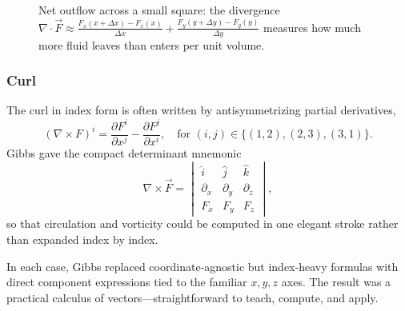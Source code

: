 \begin{figure}[H]
    \centering
    \caption{Net outflow across a small square: the divergence 
    \(\nabla\!\cdot\vec F\approx\frac{F_x(x+\Delta x)-F_x(x)}{\Delta x}+\frac{F_y(y+\Delta y)-F_y(y)}{\Delta y}\)
    measures how much more fluid leaves than enters per unit volume.}
\end{figure}







\subsubsection{Curl}
The curl in index form is often written by antisymmetrizing partial derivatives,
\[
(\nabla\times F)^i = \frac{\partial F^i}{\partial x^j} - \frac{\partial F^j}{\partial x^i},
\quad\text{for }(i,j)\in\{(1,2),(2,3),(3,1)\}.
\]
Gibbs gave the compact determinant mnemonic
\[
\nabla\times\vec F
=\begin{vmatrix}
\hat i & \hat j & \hat k\\
\partial_x & \partial_y & \partial_z\\
F_x        & F_y        & F_z
\end{vmatrix},
\]
so that circulation and vorticity could be computed in one elegant stroke rather than expanded index by index.

In each case, Gibbs replaced coordinate‐agnostic but index‐heavy formulas with direct component expressions tied to the familiar \(x,y,z\) axes.  The result was a practical calculus of vectors—straightforward to teach, compute, and apply.  


